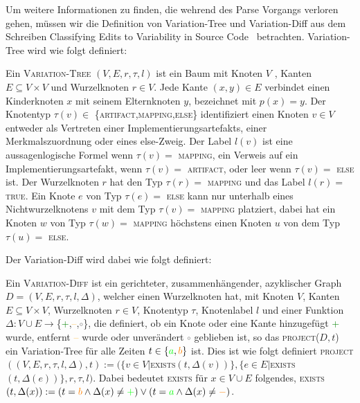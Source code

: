  
Um weitere Informationen zu finden, die wehrend des Parse Vorgangs verloren gehen, müssen wir die Definition von Variation-Tree und Variation-Diff aus dem Schreiben Classifying Edits to Variability in Source Code~\cite{BTS+:ESECFSE22}
 betrachten. Variation-Tree wird wie folgt definiert:
 \begin{definition}
 	Ein \textsc{Variation-Tree}  $(V,E,r,\tau,l)$ ist ein Baum mit Knoten $V$ , Kanten $E \subseteq V \times V$ und Wurzelknoten $r \in V$. Jede Kante $(x,y) \in E$ verbindet einen Kinderknoten $x$ mit seinem Elternknoten $y$, bezeichnet mit $p(x) = y$. Der Knotentyp $\tau(v) \in $ \{\textsc{artifact,mapping,else}\} identifiziert einen Knoten $v \in V$ entweder als Vertreten einer Implementierungsartefakts, einer Merkmalszuordnung oder eines else-Zweig. Der Label $l(v)$ ist eine aussagenlogische Formel wenn $\tau(v) =$ \textsc{mapping}, ein Verweis auf ein Implementierungsartefakt, wenn $\tau(v) = $ \textsc{artifact}, oder leer wenn $\tau(v) =$ \textsc{else} ist. Der Wurzelknoten $r$ hat den Typ $\tau(r) =$ \textsc{mapping} und das Label $l(r) = $ \textsc{true}. Ein Knote $e$ von Typ $\tau(e) =$ \textsc{else} kann nur unterhalb eines Nichtwurzelknotens $v$ mit dem Typ $\tau(v) =$ \textsc{mapping} platziert, dabei hat ein Knoten $w$ von Typ $\tau(w) =$ \textsc{mapping} höchstens einen Knoten $u$ von dem Typ $\tau(u) =$ \textsc{else}.
 \end{definition}
  Der Variation-Diff wird dabei wie folgt definiert:
  \begin{definition}
  	Ein \textsc{Variation-Diff} ist ein gerichteter, zusammenhängender, azyklischer Graph $D=(V,E,r,\tau,l,\Delta) $, welcher einen Wurzelknoten hat, mit Knoten $V$, Kanten $E \subseteq V \times V$, Wurzelknoten $r \in V$, Knotentyp $\tau$, Knotenlabel $l$ und einer Funktion $\Delta : V \cup E \to $\{\textcolor{green}{+},\textcolor{orange}{--},\textcolor{gray}{$\circ$}\}, die definiert, ob ein Knote oder eine Kante hinzugefügt \textcolor{green}{+} wurde, entfernt \textcolor{orange}{--} wurde oder unverändert \textcolor{gray}{$\circ$} geblieben ist, so das \textsc{project}($D,t$) ein Variation-Tree für alle Zeiten $t \in \{\textcolor{green}{a},\textcolor{orange}{b}\}$ ist. Dies ist wie folgt definiert \textsc{project}$((V,E,r,\tau,l,\Delta),t) := (\{v \in V | $\textsc{exists}$(t,\Delta(v))\},\{e \in E | $\textsc{exists}$(t,\Delta(e))\},r,\tau,l)$. Dabei bedeutet \textsc{exists} für $x \in V \cup E$ folgendes, \textsc{exists}$(t,\Delta(x)) := (t = \textcolor{orange}{b} \land \Delta(x) \neq \textcolor{green}{+}) \lor (t = \textcolor{green}{a} \land \Delta(x) \neq \textcolor{orange}{-})$.
  \end{definition}
    
